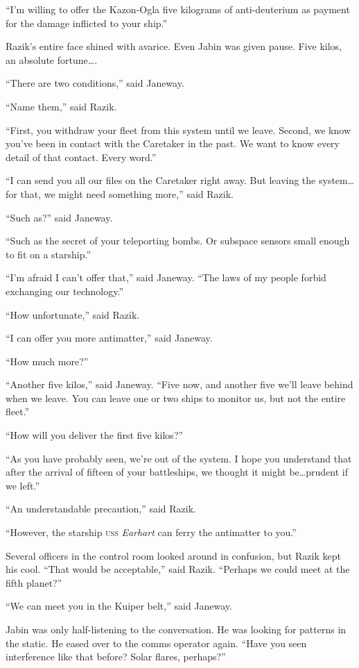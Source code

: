 \documentclass[twoside,letterpaper,12pt]{memoir}
\begin{document}
``I'm willing to offer the Kazon-Ogla five kilograms of anti-deuterium as payment for the damage inflicted to your ship.''

Razik's entire face shined with avarice. Even Jabin was given pause. Five kilos, an absolute fortune\ldots .

``There are two conditions,'' said Janeway.

``Name them,'' said Razik.

``First, you withdraw your fleet from this system until we leave. Second, we know you've been in contact with the Caretaker in the past. We want to know every detail of that contact. Every word.''

``I can send you all our files on the Caretaker right away. But leaving the system\ldots for that, we might need something more,'' said Razik.

``Such as?'' said Janeway.

``Such as the secret of your teleporting bombs. Or subspace sensors small enough to fit on a starship.''

``I'm afraid I can't offer that,'' said Janeway. ``The laws of my people forbid exchanging our technology.''

``How unfortunate,'' said Razik.

``I can offer you more antimatter,'' said Janeway.

``How much more?''

``Another five kilos,'' said Janeway. ``Five now, and another five we'll leave behind when we leave. You can leave one or two ships to monitor us, but not the entire fleet.''

``How will you deliver the first five kilos?''

``As you have probably seen, we're out of the system. I hope you understand that after the arrival of fifteen of your battleships, we thought it might be\ldots prudent if we left.''

``An understandable precaution,'' said Razik.

``However, the starship \textsc{uss} \textit{Earhart} can ferry the antimatter to you.''

Several officers in the control room looked around in confusion, but Razik kept his cool. ``That would be acceptable,'' said Razik. ``Perhaps we could meet at the fifth planet?''

``We can meet you in the Kuiper belt,'' said Janeway.

Jabin was only half-listening to the conversation. He was looking for patterns in the static. He eased over to the comms operator again. ``Have you seen interference like that before? Solar flares, perhaps?''
\end{document}
